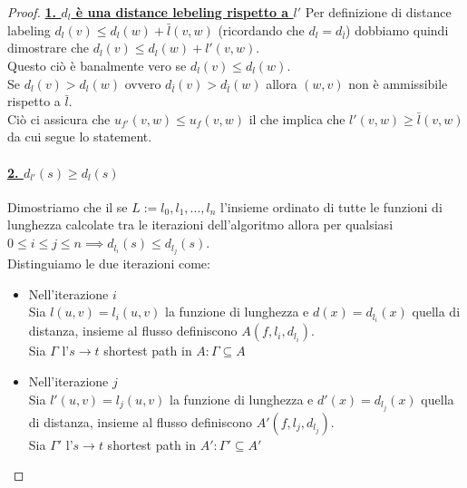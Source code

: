 \documentclass[a4paper, 11pt]{report}
\begin{document}
    \begin{proof}
        \textbf{\underline{1. $d_l$ è una distance lebeling rispetto a $l'$}}
            Per definizione di distance labeling $d_l(v) \le d_l(w) + \bar{l}(v,w)$ (ricordando che $d_l = d_{\bar{l}}$) 
            dobbiamo quindi dimostrare che  $d_l(v) \le d_l(w) + l'(v,w)$.\\
            Questo ciò è banalmente vero se $d_l(v) \le d_l(w)$.\\
            Se $d_l(v) > d_l(w)$ ovvero $d_{\bar{l}}(v) > d_{\bar{l}}(w)$ allora $(w,v)$ non è ammissibile rispetto a $\bar{l}$.\\
            Ciò ci assicura che $u_{f'}(v,w)\le u_{f}(v,w)$ il che implica che \colorbox{yellow!40!white}{$l'(v,w)\ge \bar{l}(v,w)$} da cui segue lo statement.

            \paragraph*{\underline{2. $d_{l'}(s) \ge d_l(s)$}}

            Dimostriamo che il se $L:= {l_0, l_1, ..., l_n}$ l'insieme ordinato di tutte le funzioni di lunghezza
            calcolate tra le iterazioni dell'algoritmo allora per qualsiasi $0 \le i \le j \le n \implies d_{l_i}(s) \le d_{l_j}(s)$.\\
            Distinguiamo le due iterazioni come:
            \begin{itemize}
                \item Nell'iterazione $i$\\
                Sia $l(u,v) = l_i(u,v)$ la funzione di lunghezza e $d(x) = d_{l_i}(x)$ quella di distanza, insieme al flusso definiscono $A(f, l_i, d_{l_i})$.\\ Sia $\Gamma$ l'$s\rightarrow t$ shortest path in $A: \Gamma \subseteq A$
                \item Nell'iterazione $j$\\
                Sia $l'(u,v) = l_j(u,v)$ la funzione di lunghezza e $d'(x) = d_{l_j}(x)$ quella di distanza, insieme al flusso definiscono $A'(f, l_j, d_{l_j})$.\\ Sia $\Gamma'$ l'$s\rightarrow t$ shortest path in $A': \Gamma' \subseteq A'$
            \end{itemize}
            

\end{proof}
\end{document}
